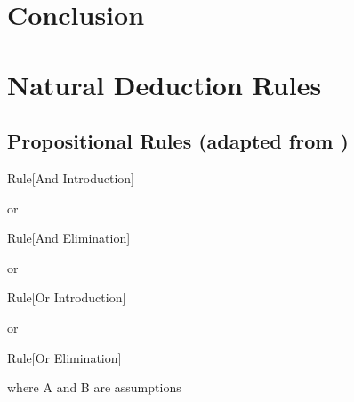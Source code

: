 \pagebreak
\section{Conclusion}

\pagebreak
\appendix
\section{Natural Deduction Rules}
\label{appendix:nd}

\subsection{Propositional Rules (adapted from \cite{ndBook})}
\label{appendix:nd-prop}

\begin{namedthm}{Rule}[And Introduction]

\begin{bprooftree}
\end{bprooftree}\qquad or \qquad
\begin{bprooftree}
\end{bprooftree}

\end{namedthm}

\begin{namedthm}{Rule}[And Elimination]

\begin{bprooftree}
\end{bprooftree}\qquad or \qquad
\begin{bprooftree}
\end{bprooftree}

\end{namedthm}

\begin{namedthm}{Rule}[Or Introduction]

\begin{bprooftree}
\end{bprooftree}\qquad or \qquad
\begin{bprooftree}
\end{bprooftree}

\end{namedthm}

\begin{namedthm}{Rule}[Or Elimination]

\begin{bprooftree}
\end{bprooftree}\qquad where A and B are assumptions

\end{namedthm}

